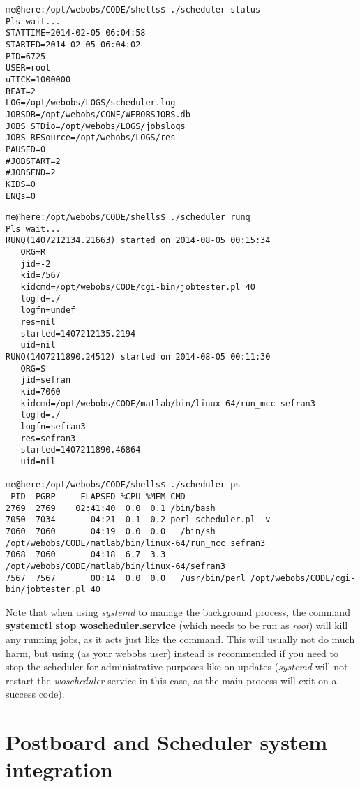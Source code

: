\begin{lstlisting}[style=console,title=example scheduler status]
me@here:/opt/webobs/CODE/shells$ ./scheduler status
Pls wait...
STATTIME=2014-02-05 06:04:58
STARTED=2014-02-05 06:04:02
PID=6725
USER=root
uTICK=1000000
BEAT=2
LOG=/opt/webobs/LOGS/scheduler.log
JOBSDB=/opt/webobs/CONF/WEBOBSJOBS.db
JOBS STDio=/opt/webobs/LOGS/jobslogs
JOBS RESource=/opt/webobs/LOGS/res
PAUSED=0
#JOBSTART=2
#JOBSEND=2
KIDS=0
ENQs=0
\end{lstlisting}

\begin{lstlisting}[style=console,title=example runq and ps]
me@here:/opt/webobs/CODE/shells$ ./scheduler runq
Pls wait...
RUNQ(1407212134.21663) started on 2014-08-05 00:15:34
   ORG=R
   jid=-2
   kid=7567
   kidcmd=/opt/webobs/CODE/cgi-bin/jobtester.pl 40 
   logfd=./
   logfn=undef
   res=nil
   started=1407212135.2194
   uid=nil
RUNQ(1407211890.24512) started on 2014-08-05 00:11:30
   ORG=S
   jid=sefran
   kid=7060
   kidcmd=/opt/webobs/CODE/matlab/bin/linux-64/run_mcc sefran3 
   logfd=./
   logfn=sefran3
   res=sefran3
   started=1407211890.46864
   uid=nil

me@here:/opt/webobs/CODE/shells$ ./scheduler ps
 PID  PGRP     ELAPSED %CPU %MEM CMD
2769  2769    02:41:40  0.0  0.1 /bin/bash
7050  7034       04:21  0.1  0.2 perl scheduler.pl -v
7060  7060       04:19  0.0  0.0   /bin/sh /opt/webobs/CODE/matlab/bin/linux-64/run_mcc sefran3
7068  7060       04:18  6.7  3.3     /opt/webobs/CODE/matlab/bin/linux-64/sefran3
7567  7567       00:14  0.0  0.0   /usr/bin/perl /opt/webobs/CODE/cgi-bin/jobtester.pl 40
\end{lstlisting}

Note that when using \textit{systemd} to manage the 
background process, the command \textbf{systemctl stop woscheduler.service}
(which needs to be run as \textit{root}) will kill any running jobs, as it acts
just like the  command.  This will usually not do
much harm, but using  (as your webobs user) instead is
recommended if you need to stop the scheduler for administrative purposes
like on updates (\textit{systemd} will not restart the \textit{woscheduler}
service in this case, as the main process will exit on a success code).

\section{Postboard and Scheduler system integration}


